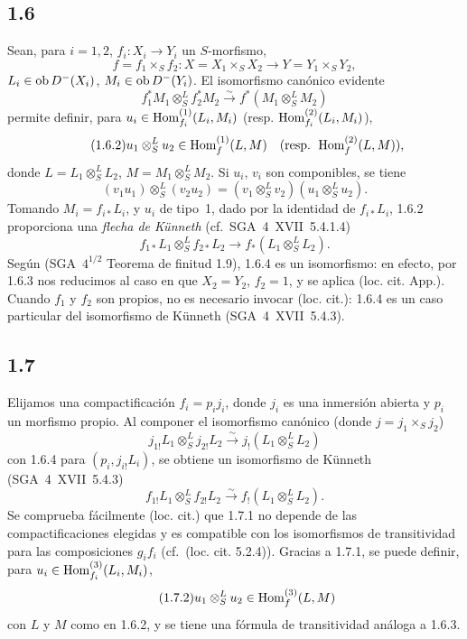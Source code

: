 \subsection*{1.6}
Sean, para $i=1,2$, $f_i:X_i\to Y_i$ un $S$-morfismo,
\[
f=f_1\times_S f_2:X=X_1\times_S X_2\to Y=Y_1\times_S Y_2,
\]
$L_i\in\operatorname{ob} D^{-}(X_i)$, $M_i\in\operatorname{ob} D^{-}(Y_i)$. El isomorfismo canónico evidente
\begin{equation}\tag{1.6.1}
f_1^{*}M_1\otimes^{L}_{S}f_2^{*}M_2\xrightarrow{\sim}f^{*}(M_1\otimes^{L}_{S}M_2)
\end{equation}
permite definir, para $u_i\in\operatorname{Hom}_{f_i}^{(1)}(L_i,M_i)$ (resp. $\operatorname{Hom}_{f_i}^{(2)}(L_i,M_i)$),
\begin{equation}\tag{1.6.2}
u_1\otimes^{L}_{S}u_2\in\operatorname{Hom}_{f}^{(1)}(L,M)\quad(\text{resp. }\operatorname{Hom}_f^{(2)}(L,M)),
\end{equation}
donde $L=L_1\otimes^{L}_{S}L_2$, $M=M_1\otimes^{L}_{S}M_2$. Si $u_i$, $v_i$ son componibles, se tiene
\begin{equation}\tag{1.6.3}
(v_1u_1)\otimes^{L}_{S}(v_2u_2)=(v_1\otimes^{L}_{S}v_2)(u_1\otimes^{L}_{S}u_2).
\end{equation}
Tomando $M_i=f_{i*}L_i$, y $u_i$ de tipo~1, dado por la identidad de $f_{i*}L_i$, 1.6.2 proporciona una \emph{flecha de Künneth} (cf.~SGA~4~XVII~5.4.1.4)
\begin{equation}\tag{1.6.4}
f_{1*}L_1\otimes^{L}_{S}f_{2*}L_2\longrightarrow f_{*}(L_1\otimes^{L}_{S}L_2).
\end{equation}
Según (SGA~$4^{1/2}$ Teorema de finitud 1.9), 1.6.4 es un isomorfismo: en efecto, por 1.6.3 nos reducimos al caso en que $X_2=Y_2$, $f_2=1$, y se aplica (loc. cit. App.). Cuando $f_1$ y $f_2$ son propios, no es necesario invocar (loc. cit.): 1.6.4 es un caso particular del isomorfismo de Künneth (SGA~4~XVII~5.4.3).

\subsection*{1.7}
Elijamos una compactificación $f_i=p_i j_i$, donde $j_i$ es una inmersión abierta y $p_i$ un morfismo propio. Al componer el isomorfismo canónico (donde $j=j_1\times_S j_2$)
\[
j_{1!}L_1\otimes^{L}_{S}j_{2!}L_2\xrightarrow{\sim}j_{!}(L_1\otimes^{L}_{S}L_2)
\]
con 1.6.4 para $(p_i,j_{i!}L_i)$, se obtiene un isomorfismo de Künneth (SGA~4~XVII~5.4.3)
\begin{equation}\tag{1.7.1}
f_{1!}L_1\otimes^{L}_{S}f_{2!}L_2\xrightarrow{\sim}f_{!}(L_1\otimes^{L}_{S}L_2).
\end{equation}
Se comprueba fácilmente (loc. cit.) que 1.7.1 no depende de las compactificaciones elegidas y es compatible con los isomorfismos de transitividad para las composiciones $g_if_i$ (cf.~(loc. cit. 5.2.4)). Gracias a 1.7.1, se puede definir, para $u_i\in\operatorname{Hom}_{f_i}^{(3)}(L_i,M_i)$,
\begin{equation}\tag{1.7.2}
u_1\otimes^{L}_{S}u_2\in\operatorname{Hom}_f^{(3)}(L,M)
\end{equation}
con $L$ y $M$ como en 1.6.2, y se tiene una fórmula de transitividad análoga a 1.6.3.

